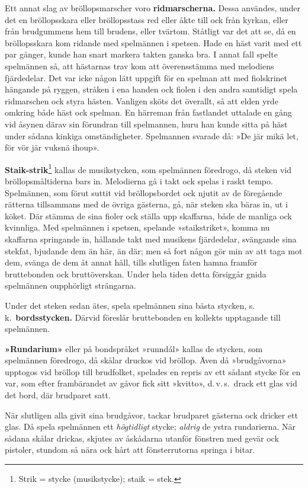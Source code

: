 \begin{multicols}{2}
Ett annat slag av bröllopsmarscher voro \textbf{ridmarscherna.} Dessa
användes, under det en bröllopsskara eller bröllopsstass red eller
åkte till ock från kyrkan, eller från brudgummens hem till brudens,
eller tvärtom. Ståtligt var det att se, då en bröllopsskara kom ridande
med spelmännen i spetsen. Hade en häst varit med ett par gånger, kunde
han snart markera takten ganska bra. I annat fall spelte spelmännen
så, att hästarnas trav kom att överensstämma med melodiens fjärdedelar.
Det var icke någon lätt uppgift för en spelman att med fiolskrinet
hängande på ryggen, stråken i ena handen ock fiolen i den andra samtidigt
spela ridmarschen ock styra hästen. Vanligen sköts det överallt, så
att elden yrde omkring både häst ock spelman. En härreman från fastlandet
uttalade en gång vid åsynen därav sin förundran till spelmannen, huru
han kunde sitta på häst under sådana kinkiga omständigheter. Spelmannen
svarade då: »De jär mikä let, för vör jär vuksnä ihoup».

\textbf{Staik-strik}\footnote{Strik = stycke (musikstycke); staik = stek.}
kallas de musikstycken, som spelmännen föredrogo, då steken vid bröllops\-mål\-tid\-erna
bars in. Melodierna gå i  takt ock spelas i raskt tempo.
Spelmännen, som förut suttit vid bröllopsbordet ock njutit av de föregående
rätterna tillsammans med de övriga gästerna, gå, när steken ska bäras
in, ut i köket. Där stämma de sina fioler ock ställa upp skaffarna,
både de manliga ock kvinnliga. Med spelmännen i spetsen, spelande
»staikstriket», komma nu skaffarna springande in, hållande takt med
musikens fjärdedelar, svängande sina stekfat, bjudande dem än här,
än där; men så fort någon gör min av att taga mot dem, svänga de dem
åt annat håll, tills slutligen faten hamna framför bruttebonden ock
bruttöverskan. Under hela tiden detta försiggår gnida spelmännen oupphörligt
strängarna.

Under det steken sedan ätes, spela spelmännen sina bästa stycken,
s.\,k.\ \textbf{bordsstycken.} Därvid föreslår bruttebonden en kollekts
upptagande till spelmännen.

\textbf{»Rundarium»} eller på bondspråket »runndál» kallas de stycken,
som spelmännen föredrogo, då skålar druckos vid bröllop. Även då »brudgåvorna»
upptogos vid bröllop till brudfolket, spelades en repris av ett sådant
stycke för en var, som efter frambärandet av gåvor fick sitt »kvitto»,
d.\,v.\,s.\ drack ett glas vid det bord, där brudparet satt.

När slutligen alla givit sina brudgåvor, tackar brudparet gästerna
ock dricker ett glas. Då spela spelmännen ett \textit{högtidligt}
stycke; \textit{aldrig} de ystra rundarierna. När sådana skålar drickas,
skjutes av åskådarna utanför fönstren med gevär ock pistoler, stundom
så nära ock hårt att fönsterrutorna springa i bitar.

\end{multicols}
\restoregeometry
\fancyhfoffset[E,O]{0pt}
\clearpage
\pagestyle{fancy}


